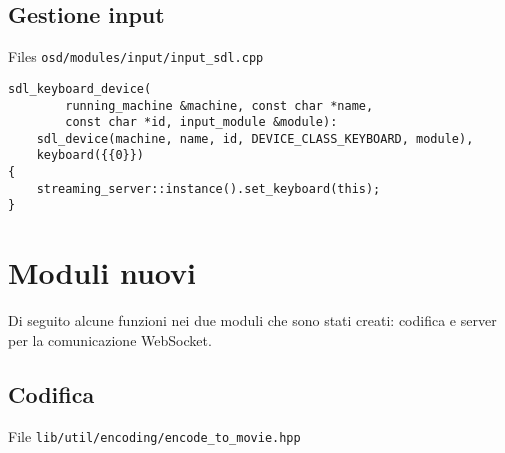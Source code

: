 \subsection{Gestione input}
Files \verb|osd/modules/input/input_sdl.cpp|

\begin{lstlisting}
sdl_keyboard_device(
		running_machine &machine, const char *name,
		const char *id, input_module &module): 
	sdl_device(machine, name, id, DEVICE_CLASS_KEYBOARD, module),
	keyboard({{0}})
{
	streaming_server::instance().set_keyboard(this);
}
\end{lstlisting}

\section{Moduli nuovi}
Di seguito alcune funzioni nei due moduli che sono stati creati: codifica e server per la comunicazione WebSocket.


\subsection{Codifica}
File \verb|lib/util/encoding/encode_to_movie.hpp|

